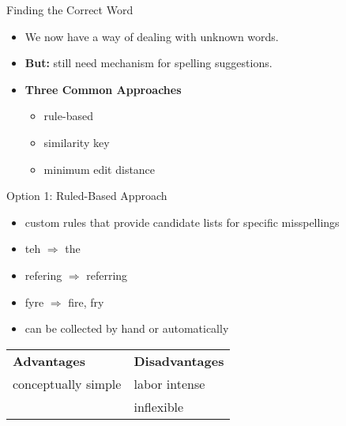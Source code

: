 \documentclass[professionalfonts, xcolor={usenames,svgnames,x11names,table}]{beamer}
\begin{document}
\begin{frame}{Finding the Correct Word}
    \begin{itemize}
        \item We now have a way of dealing with unknown words.
        \item \textbf{But:} still need mechanism for spelling suggestions.
        \item \textbf{Three Common Approaches}
            \begin{itemize}
                \item rule-based
                \item similarity key
                \item minimum edit distance
            \end{itemize}
    \end{itemize}
\end{frame}

\begin{frame}{Option 1: Ruled-Based Approach}
    \begin{itemize}
        \item custom rules that provide candidate lists for specific misspellings
    \end{itemize}
    \begin{example}
        \begin{itemize}
            \item teh $\Rightarrow$ the
            \item refering $\Rightarrow$ referring
            \item fyre $\Rightarrow$ fire, fry
        \end{itemize}
    \end{example}
    \begin{itemize}
        \item can be collected by hand or automatically
    \end{itemize}
    \pause
    \begin{center}
        \begin{tabular}{ll}
            \textbf{Advantages} & \textbf{Disadvantages}\\
            conceptually simple & labor intense\\
                                & inflexible
        \end{tabular}
    \end{center}
\end{frame}
\end{document}
